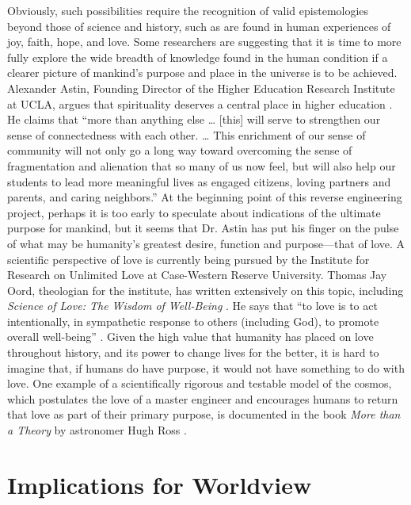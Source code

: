 Obviously, such possibilities require the recognition of valid
epistemologies beyond those of science and history, such as are found
in human experiences of joy, faith, hope, and love. Some researchers
are suggesting that it is time to more fully explore the wide breadth of
knowledge found in the human condition if a clearer picture of
mankind’s purpose and place in the universe is to be achieved.
Alexander Astin, Founding Director of the Higher Education Research
Institute at UCLA, argues that spirituality deserves a central place in
higher education \citep{astin2004}. He claims that ``more than
anything else {\ldots} [this] will serve to strengthen our sense of
connectedness with each other. {\ldots} This enrichment of our sense of community
will not only go a long way toward overcoming the sense of
fragmentation and alienation that so many of us now feel, but will also
help our students to lead more meaningful lives as engaged citizens,
loving partners and parents, and caring neighbors.'' At the beginning
point of this reverse engineering project, perhaps it is too early to
speculate about indications of the ultimate purpose for mankind, but it
seems that Dr. Astin has put his finger on the pulse of what may be
humanity’s greatest desire, function and purpose---that of love. A
scientific perspective of love is currently being pursued by the
Institute for Research on Unlimited Love at Case-Western Reserve
University. Thomas Jay Oord, theologian for the institute, has written
extensively on this topic, including \textit{Science of Love: The
Wisdom of Well-Being} \citep{oord2004}. He says that
“to love is to act intentionally, in
sympathetic response to others (including God), to promote overall
well-being” \citep[][p.~75]{oord2004}. Given the high value that humanity has placed on love
throughout history, and its power to change lives for the better, it is
hard to imagine that, if humans do have purpose, it would not have
something to do with love. One example of a scientifically rigorous and
testable model of the cosmos, which postulates the love of a master
engineer and encourages humans to return that love as part of their
primary purpose, is documented in the book
\textit{More than a Theory} 
by astronomer Hugh Ross
\citep{ross2009}.

\section{Implications for Worldview}

